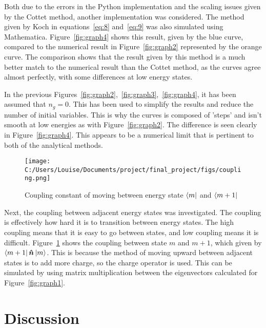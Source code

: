 \documentclass[11pt]{article}
\begin{document}
Both due to the errors in the Python implementation and the scaling issues given by the Cottet method, another implementation was considered. The method given by Koch in equations~\ref{eq:8} and~\ref{eq:9} was also simulated using Mathematica. Figure~\ref{fig:graph4} shows this result, given by the blue curve, compared to the numerical result in Figure~\ref{fig:graph2} represented by the orange curve. The comparison shows that the result given by this method is a much better match to the numerical result than the Cottet method, as the curves agree almost perfectly, with some differences at low energy states.

In the previous Figures~\ref{fig:graph2},~\ref{fig:graph3},~\ref{fig:graph4}, it has been assumed that $n_g = 0$. This has been used to simplify the results and reduce the number of initial variables. This is why the curves is composed of 'steps' and isn't smooth at low energies as with Figure~\ref{fig:graph2}. The difference is seen clearly in Figure~\ref{fig:graph4}. This appears to be a numerical limit that is pertinent to both of the analytical methods.

\begin{figure}[ht]
\centering
\texttt{[image: C:/Users/Louise/Documents/project/final\_project/figs/coupling.png]}
\caption{Coupling constant of moving between energy state $\bra{m}$ and $\bra{m+1}$}
\label{fig:graph5}
\end{figure}

Next, the coupling between adjacent energy states was investigated. The coupling is effectively how hard it is to transition between energy states. The high coupling means that it is easy to go between states, and low coupling means it is difficult. Figure~\ref{fig:graph5} shows the coupling between state $m$ and $m+1$, which given by $\bra{m+1}\boldsymbol{\hat{n}}\ket{m}$. This is because the method of moving upward between adjacent states is to add more charge, so the charge operator is used. This can be simulated by using matrix multiplication between the eigenvectors calculated for Figure~\ref{fig:graph1}.

\section{Discussion}
\end{document}
